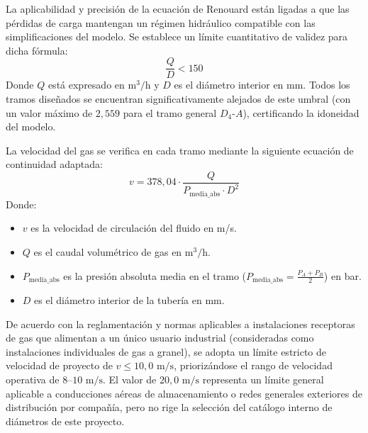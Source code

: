 \documentclass[12pt]{article}
\begin{document}
        La aplicabilidad y precisión de la ecuación de Renouard están ligadas a que las pérdidas de carga mantengan un régimen hidráulico compatible con las simplificaciones del modelo. Se establece un límite cuantitativo de validez para dicha fórmula:
        \begin{equation}
            \frac{Q}{D} < 150
        \end{equation}
        Donde $Q$ está expresado en $\text{m}^3\text{/h}$ y $D$ es el diámetro interior en mm. Todos los tramos diseñados se encuentran significativamente alejados de este umbral (con un valor máximo de $2,559$ para el tramo general $D_4$-$A$), certificando la idoneidad del modelo.

        La velocidad del gas se verifica en cada tramo mediante la siguiente ecuación de continuidad adaptada:
        \begin{equation}
            v = 378,04 \cdot \frac{Q}{P_{\text{media\_abs}} \cdot D^2}
        \end{equation}
        Donde:
        \begin{itemize}
            \item $v$ es la velocidad de circulación del fluido en m/s.
            \item $Q$ es el caudal volumétrico de gas en $\text{m}^3\text{/h}$.
            \item $P_{\text{media\_abs}}$ es la presión absoluta media en el tramo ($P_{\text{media\_abs}} = \frac{P_A + P_B}{2}$) en bar.
            \item $D$ es el diámetro interior de la tubería en mm.
        \end{itemize}
        De acuerdo con la reglamentación y normas aplicables a instalaciones receptoras de gas que alimentan a un único usuario industrial (consideradas como instalaciones individuales de gas a granel), se adopta un límite estricto de velocidad de proyecto de $v \le 10,0\text{ m/s}$, priorizándose el rango de velocidad operativa de $8\text{--}10\text{ m/s}$. El valor de $20,0\text{ m/s}$ representa un límite general aplicable a conducciones aéreas de almacenamiento o redes generales exteriores de distribución por compañía, pero no rige la selección del catálogo interno de diámetros de este proyecto.
\end{document}
